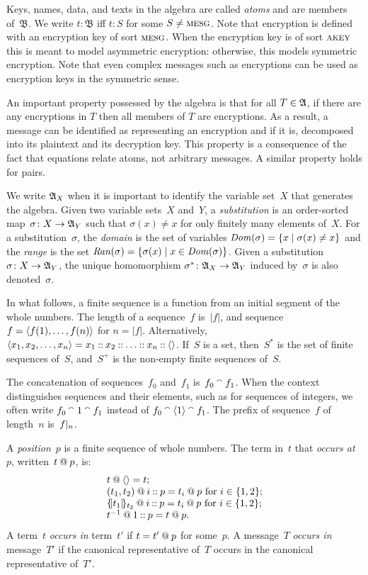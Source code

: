 \documentclass[12pt]{article}
\theoremstyle{definition}
\newcommand{\scap}[1]{\ensuremath{\mathop{\relax
                    \smash{\mbox{\sc#1}}}\!\mathop{\vphantom{#1}}\nolimits}}
\newcommand{\alga}{\alg{A}}
\newcommand{\base}{\ensuremath{\mathfrak B}}
\newcommand{\sdom}{\fn{Dom}}
\newcommand{\sran}{\fn{Ran}}
\begin{document}
Keys, names, data, and texts in the algebra are called \emph{atoms} and
are members of~$\base$.  We write $t\colon\base$ iff $t\colon S$ for 
some $S \neq \scap{mesg}$.  Note that encryption is defined with an 
encryption key of sort $\scap{mesg}$.  When the encryption key is of sort
$\scap{akey}$ this is meant to model asymmetric encryption: otherwise,
this models symmetric encryption.  Note that even complex messages such
as encryptions can be used as encryption keys in the symmetric sense.

An important property possessed by the algebra is that for all $T\in\alga$,
if there are any encryptions in $T$ then all members of $T$ are encryptions.
As a result, a message can be identified as representing an encryption
and if it is, decomposed into its plaintext and its decryption key.
This property is a consequence of the fact that equations relate
atoms, not arbitrary messages.  A similar property holds for pairs.

We write $\alga_X$ when it is important to identify the variable
set~$X$ that generates the algebra.  Given two variable sets~$X$
and~$Y$, a \emph{substitution} is an order-sorted map~$\sigma\colon
X\rightarrow\alga_Y$ such that $\sigma(x)\neq x$ for only finitely many
elements of~$X$.  For a substitution~$\sigma$, the \emph{domain} is
the set of variables $\sdom(\sigma)=\{x\mid \sigma(x)\neq x\}$ and the
\emph{range} is the set $\sran(\sigma)=\{\sigma(x)\mid
x\in\sdom(\sigma)\}$.  Given a substitution~$\sigma\colon
X\rightarrow\alga_Y$, the unique homomorphism $\sigma^\ast\colon
\alga_X\rightarrow\alga_Y$ induced by~$\sigma$ is also denoted~$\sigma$.

In what follows, a finite sequence is a function from an initial
segment of the whole numbers.  The length of a sequence~$f$ is~$|f|$,
and sequence~$f=\langle f(1),\ldots,f(n)\rangle$ for $n=|f|$.  Alternatively,
$\langle x_1,x_2,\ldots,x_n\rangle =x_1\mathbin{::} x_2\mathbin{::}\ldots\mathbin{::}
x_n\mathbin{::}\langle\rangle$.  If~$S$ is a set, then~$S^\ast$ is the set of finite
sequences of~$S$, and~$S^+$ is the non-empty finite sequences of~$S$.

The concatenation of sequences~$f_0$ and~$f_1$ is~$f_0\mathbin{{}^\smallfrown} f_1$.
When the context distinguishes sequences and their elements, such as
for sequences of integers, we often write $f_0\mathbin{{}^\smallfrown} 1 \mathbin{{}^\smallfrown} f_1$
instead of $f_0\mathbin{{}^\smallfrown}\langle1\rangle\mathbin{{}^\smallfrown} f_1$.  The prefix of sequence~$f$
of length~$n$ is~$f|_{n}$.

A \emph{position}~$p$ is a finite sequence of whole numbers.  The
term in~$t$ that \emph{occurs at}~$p$, written~$t\mathbin{@} p$, is:
$$\begin{array}{l}
t\mathbin{@}\langle\rangle=t;\\
(t_1,t_2)\mathbin{@} i\mathbin{::} p=t_i\mathbin{@} p\mbox{ for $i\in\{1,2\}$};\\
\{\!|t_1|\!\}_{t_2}\mathbin{@} i\mathbin{::} p=t_i\mathbin{@} p\mbox{ for
  $i\in\{1,2\}$};\\
t^{-1}\mathbin{@} 1\mathbin{::} p=t\mathbin{@} p.
\end{array}$$
A term~$t$ \emph{occurs in} term~$t'$ if $t=t'\mathbin{@} p$ for some~$p$.
A message~$T$ \emph{occurs in} message~$T'$ if the canonical
representative of~$T$ occurs in the canonical representative of~$T'$.
\end{document}
